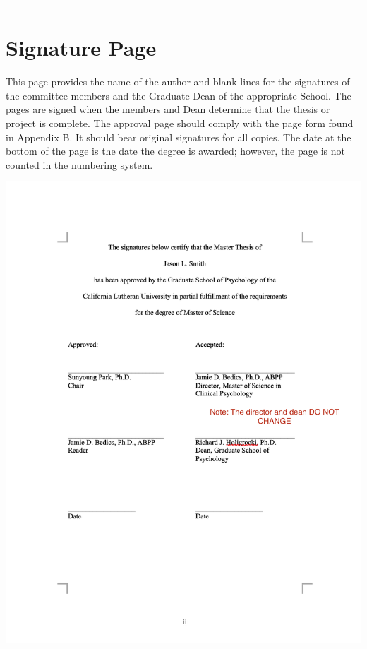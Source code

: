 \documentclass[openany]{book}
\begin{document}
\begin{center}\rule{0.5\linewidth}{0.5pt}\end{center}

\hypertarget{signature-page}{%
\section{Signature Page}\label{signature-page}}

This page provides the name of the author and blank lines for the signatures of the committee members and the Graduate Dean of the appropriate School. The pages are signed when the members and Dean determine that the thesis or project is complete. The approval page should comply with the page form found in Appendix B. It should bear original signatures for all copies. The date at the bottom of the page is the date the degree is awarded; however, the page is not counted in the numbering system.

\includegraphics{images/signaturepage.png}
\end{document}
